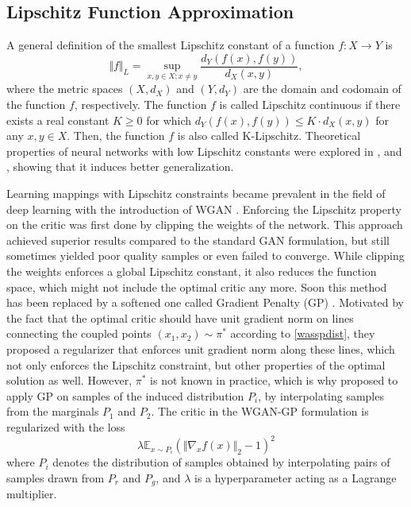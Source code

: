 \documentclass{article}
\begin{document}
\subsection{Lipschitz Function Approximation}
A general definition of the smallest Lipschitz constant of a function $f:X\to Y$ is
\begin{equation} \label{lip_const}
\Vert{f}\Vert_L=\sup_{x,y\in X;x\neq y}{\frac{d_Y(f(x),f(y))}{d_X(x,y)}},
\end{equation}
where the metric spaces $(X,d_X)$ and $(Y,d_Y)$ are the domain and codomain of the function $f$, respectively. The function $f$ is called Lipschitz continuous if there exists a real constant $K\geq 0$ for which $d_Y(f(x),f(y))\leq K\cdot d_X(x,y)$ for any $x,y\in X$. Then, the function $f$ is also called K-Lipschitz. Theoretical properties of neural networks with low Lipschitz constants were explored in \citet{Obermanetal2018}, \citet{Bartlett98} and \citet{Druckeretal92}, showing that it induces better generalization.

Learning mappings with Lipschitz constraints became prevalent in the field of deep learning with the introduction of WGAN \citep{Arjovskyetal2017}. Enforcing the Lipschitz property on the critic was first done by clipping the weights of the network. This approach achieved superior results compared to the standard GAN formulation, but still sometimes yielded poor quality samples or even failed to converge. While clipping the weights enforces a global Lipschitz constant, it also reduces the function space, which might not include the optimal critic any more. Soon this method has been replaced by a softened one called Gradient Penalty (GP) \citep{Gulrajanietal2017}. Motivated by the fact that the optimal critic should have unit gradient norm on lines connecting the coupled points $(x_1,x_2)\sim\pi^\ast$ according to \eqref{wasspdist}, they proposed a regularizer that enforces unit gradient norm along these lines, which not only enforces the Lipschitz constraint, but other properties of the optimal solution as well. However, $\pi^\ast$ is not known in practice, which is why \citet{Gulrajanietal2017} proposed to apply GP on samples of the induced distribution $P_i$, by interpolating samples from the marginals $P_1$ and $P_2$. The critic in the WGAN-GP formulation is regularized with the loss
\begin{equation} \label{twosided}
\lambda\mathbb{E}_{x\sim P_i}(\Vert\nabla_xf(x)\Vert_2-1)^2
\end{equation}
where $P_i$ denotes the distribution of samples obtained by interpolating pairs of samples drawn from $P_r$ and $P_g$, and $\lambda$ is a hyperparameter acting as a Lagrange multiplier.
\end{document}
